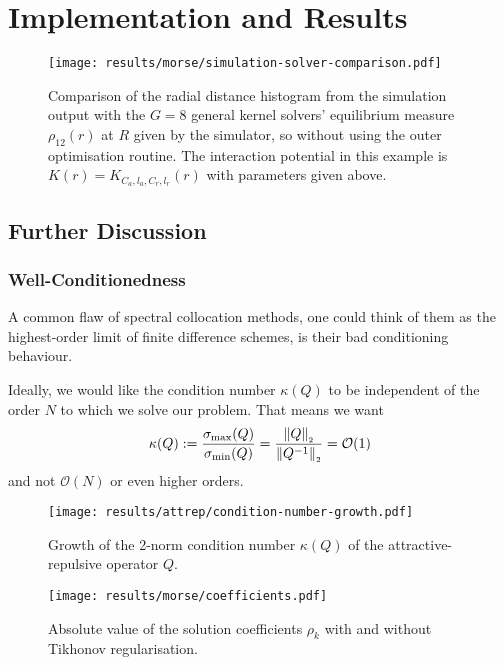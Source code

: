 \chapter{Implementation and Results}
\label{chap:implementation-and-results}

% 

\begin{figure}[H]
  \centering
  \texttt{[image: results/morse/simulation-solver-comparison.pdf]}
  \caption[Comparison of histogram and spectral method solution]{Comparison of the radial distance histogram from the simulation output with the $G = 8$ general kernel solvers' equilibrium measure $\rho_{12}(r)$ at $R$ given by the simulator, so without using the outer optimisation routine. The interaction potential in this example is $K(r) = K_{C_a, l_a, C_r, l_r}(r)$ with parameters given above.}
  \label{fig:simulation-solver-comparison}
\end{figure}

\section{Further Discussion}
\subsection{Well-Conditionedness}
A common flaw of spectral collocation methods, one could think of them as the highest-order limit of finite difference schemes, is their bad conditioning behaviour.

Ideally, we would like the condition number $\kappa(Q)$ to be independent of the order $N$ to which we solve our problem. That means we want
$$\kappa(Q) := \frac{\sigma_{\rm max}(Q)}{\sigma_{\rm min}(Q)} = \frac{\left\lVert Q\right\rVert_{\scriptscriptstyle 2}}{\left\lVert Q^{-1}\right\rVert_{\scriptscriptstyle 2}} = \mathcal{O}(1)$$
and not $\mathcal{O}(N)$ or even higher orders.

\begin{figure}[H]
  \centering
  \texttt{[image: results/attrep/condition-number-growth.pdf]}
  \caption[Growth of the condition number]{Growth of the 2-norm condition number $\kappa(Q)$ of the attractive-repulsive operator $Q$.}
  \label{fig:condition-number-growth}
\end{figure}

\begin{figure}[H]
  \centering
  \texttt{[image: results/morse/coefficients.pdf]}
  \caption[Absolute value of the coefficients with and without regularisation]{Absolute value of the solution coefficients $\rho_k$ with and without Tikhonov regularisation.}
  \label{fig:coefficients}
\end{figure}

